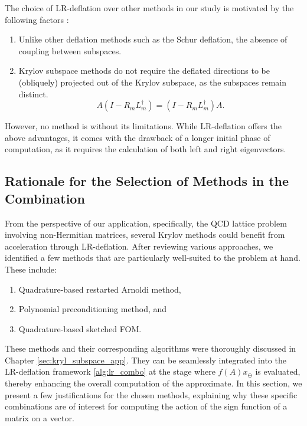 The choice of LR-deflation over other methods in our study is motivated by the following factors \cite{11}:
\begin{enumerate}
    \item Unlike other deflation methods such as the Schur deflation, the absence of coupling between subspaces.
    \item Krylov subspace methods do not require the deflated directions to be (obliquely) projected out of the Krylov subspace, as the subspaces remain distinct.
    \begin{equation}
        A(I-R_mL_m^{\dagger})=(I-R_mL_m^{\dagger})A.
    \end{equation}
\end{enumerate}

However, no method is without its limitations. While LR-deflation offers the above advantages, it comes with the drawback of a longer initial phase of computation, as it requires the calculation of both left and right eigenvectors. 

\subsection{Rationale for the Selection of Methods in the Combination}
\label{sec:rationale_selec_method_in_combo}

From the perspective of our application, specifically, the QCD lattice problem involving non-Hermitian matrices, several Krylov methods could benefit from acceleration through LR-deflation. After reviewing various approaches, we identified a few methods that are particularly well-suited to the problem at hand. These include:
\begin{enumerate}
    \item Quadrature-based restarted Arnoldi method,
    \item Polynomial preconditioning method, and
    \item Quadrature-based sketched FOM.
\end{enumerate}

These methods and their corresponding algorithms were thoroughly discussed in Chapter \ref{sec:kryl_subspace_app}. They can be seamlessly integrated into the LR-deflation framework \ref{alg:lr_combo} at the stage where $f(A)x_{\ominus}$ is evaluated, thereby enhancing the overall computation of the approximate. In this section, we present a few justifications for the chosen methods, explaining why these specific combinations are of interest for computing the action of the sign function of a matrix on a vector.

